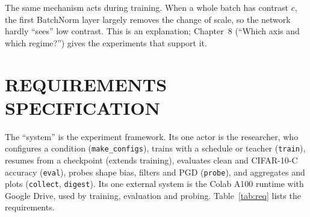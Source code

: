 \documentclass[a4paper,12pt]{report}
\begin{document}
The same mechanism acts during training. When a whole batch has contrast $c$, the first BatchNorm layer largely removes the change of scale, so the network hardly ``sees'' low contrast. This is an explanation; Chapter~8 (``Which axis and which regime?'') gives the experiments that support it.

\chapter{REQUIREMENTS SPECIFICATION}

The ``system'' is the experiment framework. Its one actor is the researcher, who configures a condition (\texttt{make\_configs}), trains with a schedule or teacher (\texttt{train}), resumes from a checkpoint (extends training), evaluates clean and CIFAR-10-C accuracy (\texttt{eval}), probes shape bias, filters and PGD (\texttt{probe}), and aggregates and plots (\texttt{collect}, \texttt{digest}). Its one external system is the Colab A100 runtime with Google Drive, used by training, evaluation and probing. Table~\ref{tab:req} lists the requirements.
\end{document}
